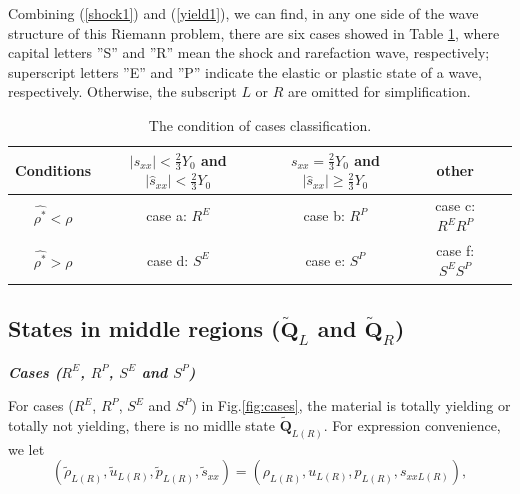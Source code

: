 \documentclass{article}
\numberwithin{equation}{section}
\numberwithin{table}{section}
\begin{document}
Combining (\ref{shock1}) and (\ref{yield1}), we can find, in any one side of the wave structure of this Riemann problem, there are six cases showed in Table \ref{tab:cases}, where capital letters ''S'' and ''R'' mean the shock and rarefaction wave, respectively; superscript letters ''E'' and  ''P'' indicate the elastic or plastic state of a wave, respectively. Otherwise, the  subscript $L$ or  $R$  are omitted for simplification.


\begin{table}
  \centering
  \caption{The condition of  cases classification.}
  \begin{tabular}{c|cccc}
	\toprule
	Conditions & $|s_{xx}|<\frac{2}{3}Y_0$ and $|\hat{s}_{xx}|<\frac{2}{3}Y_0$ & $s_{xx}=\frac{2}{3}Y_0$  and  $|\hat{s}_{xx}| \geq \frac{2}{3}Y_0$&  other\\
  \midrule
  $\hat{\rho^*} <\rho$ & case a: $R^{E}$ & case b: $ R^{P}$ & case c: $R^{E}R^{P}$ \\
  $\hat{\rho^*} >\rho$ & case d: $S^{E}$ & case e: $ S^{P}$ & case f: $S^{E}S^{P}$ \\
  \bottomrule
\end{tabular}
\label{tab:cases}
\end{table}


\subsection{States in  middle regions ($\tilde{\mathbf{Q}}_{L}$ and   $\tilde{\mathbf{Q}}_{R}$) }


\emph{\textbf{Cases ($R^{E}$, $R^{P}$, $S^{E}$ and $S^{P}$)}}

 For cases ($R^{E}$, $R^{P}$, $S^{E}$ and $S^{P}$) in Fig.\ref{fig:cases}, the material is totally yielding or totally not yielding, there is no midlle state $\tilde{\mathbf{Q}}_{L(R)}$. For  expression convenience, we let
 \begin{equation}
   (\tilde{\rho}_{L(R)},\tilde{u}_{L(R)},\tilde{p}_{L(R)},\tilde{s}_{xx}) =(\rho_{L(R)}, u_{L(R)},p_{L(R)},s_{xxL(R)}),
\end{equation}

\end{document}
